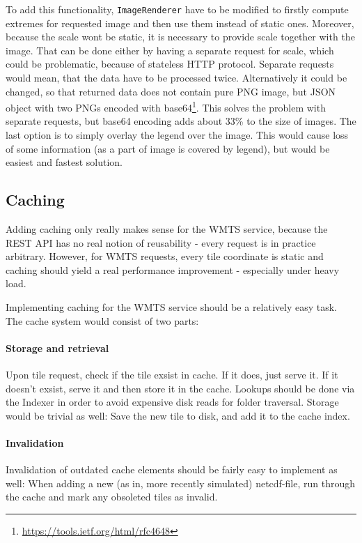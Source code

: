 \documentclass[11pt,a4paper,titlepage,oneside]{report}
\begin{document}
To add this functionality, \texttt{ImageRenderer} have to be modified to firstly compute extremes for requested image and then use them instead of static ones. Moreover, because the scale wont be static, it is necessary to provide scale together with the image. That can be done either by having a separate request for scale, which could be problematic, because of stateless HTTP protocol. Separate requests would mean, that the data have to be processed twice. Alternatively it could be changed, so that returned data does not contain pure \gls{PNG} image, but JSON object with two \gls{PNG}s encoded with base64\footnote{\url{https://tools.ietf.org/html/rfc4648}}. This solves the problem with separate requests, but base64 encoding adds about 33\% to the size of images. The last option is to simply overlay the legend over the image. This would cause loss of some information (as a part of image is covered by legend), but would be easiest and fastest solution.

\subsection{Caching}
Adding caching only really makes sense for the WMTS service, because the REST API has no real notion of reusability - every request is in practice arbitrary. However, for WMTS requests, every tile coordinate is static and caching should yield a real performance improvement - especially under heavy load.

Implementing caching for the WMTS service should be a relatively easy task. The cache system would consist of two parts:

\paragraph{Storage and retrieval}
Upon tile request, check if the tile exsist in cache. If it does, just serve it. If it doesn't exsist, serve it and then store it in the cache.
Lookups should be done via the Indexer in order to avoid expensive disk reads for folder traversal.
Storage would be trivial as well: Save the new tile to disk, and add it to the cache index.
\paragraph{Invalidation}
Invalidation of outdated cache elements should be fairly easy to implement as well: When adding a new (as in, more recently simulated) \gls{netcdf}-file, run through the cache and mark any obsoleted tiles as invalid.
\end{document}
